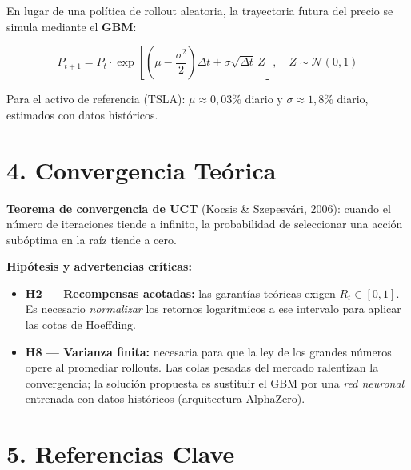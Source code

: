 \documentclass[11pt, a4paper]{article}
\begin{document}
En lugar de una política de rollout aleatoria, la trayectoria futura del precio se simula mediante el \textbf{GBM}:

\[
  P_{t+1} = P_t \cdot \exp\!\left[\left(\mu - \frac{\sigma^2}{2}\right)\Delta t + \sigma\sqrt{\Delta t}\, Z\right], \quad Z \sim \mathcal{N}(0,1)
\]

Para el activo de referencia (TSLA): $\mu \approx 0{,}03\%$ diario y $\sigma \approx 1{,}8\%$ diario, estimados con datos históricos.

\section*{4. Convergencia Teórica}

\textbf{Teorema de convergencia de UCT} (Kocsis \& Szepesvári, 2006): cuando el número de iteraciones tiende a infinito, la probabilidad de seleccionar una acción subóptima en la raíz tiende a cero.

\textbf{Hipótesis y advertencias críticas:}

\begin{itemize}
  \item \textbf{H2 — Recompensas acotadas:} las garantías teóricas exigen $R_t \in [0,1]$. Es necesario \emph{normalizar} los retornos logarítmicos a ese intervalo para aplicar las cotas de Hoeffding.
  \item \textbf{H8 — Varianza finita:} necesaria para que la ley de los grandes números opere al promediar rollouts. Las colas pesadas del mercado ralentizan la convergencia; la solución propuesta es sustituir el GBM por una \emph{red neuronal} entrenada con datos históricos (arquitectura AlphaZero).
\end{itemize}

\section*{5. Referencias Clave}
\end{document}

